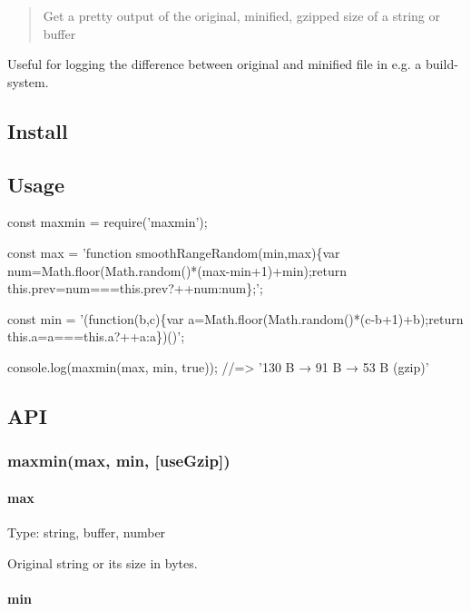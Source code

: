 \begin{quote}
Get a pretty output of the original, minified, gzipped size of a string or buffer \end{quote}




Useful for logging the difference between original and minified file in e.\+g. a build-\/system.

\subsection*{Install}




\subsection*{Usage}


\begin{DoxyCode}
const maxmin = require('maxmin');

const max = 'function smoothRangeRandom(min,max)\{var num=Math.floor(Math.random()*(max-min+1)+min);return
       this.prev=num===this.prev?++num:num\};';

const min = '(function(b,c)\{var a=Math.floor(Math.random()*(c-b+1)+b);return this.a=a===this.a?++a:a\})()';

console.log(maxmin(max, min, true));
//=> '130 B → 91 B → 53 B (gzip)'
\end{DoxyCode}


\subsection*{A\+PI}

\subsubsection*{maxmin(max, min, \mbox{[}use\+Gzip\mbox{]})}

\paragraph*{max}

Type\+: {\ttfamily string}, {\ttfamily buffer}, {\ttfamily number}

Original string or its size in bytes.

\paragraph*{min}


